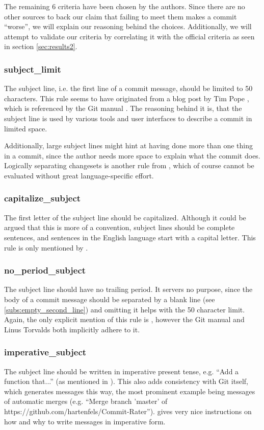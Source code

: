 The remaining 6 criteria have been chosen by the authors. Since there are no other sources to back our claim that failing to meet them makes a commit ``worse'', we will explain our reasoning behind the choices. Additionally, we will attempt to validate our criteria by correlating it with the official criteria as seen in section \ref{sec:results2}.

\subsubsection{subject\_limit}
\label{subs:subject_limit}
The subject line, i.e. the first line of a commit message, should be limited to 50 characters. This rule seems to have originated from a blog post by Tim Pope \cite{TP}, which is referenced by the Git manual \cite{OffGuide}. The reasoning behind it is, that the subject line is used by various tools and user interfaces to describe a commit in limited space.

Additionally, large subject lines might hint at having done more than one thing in a commit, since the author needs more space to explain what the commit does. Logically separating changesets is another rule from \cite{OffGuide}, which of course cannot be evaluated without great language-specific effort.

\subsubsection{capitalize\_subject}
\label{subs:capitalize_subject}
The first letter of the subject line should be capitalized. Although it could be argued that this is more of a convention, subject lines should be complete sentences, and sentences in the English language start with a capital letter. This rule is only mentioned by \cite{CB}.

\subsubsection{no\_period\_subject}
\label{subs:no_period_subject}
The subject line should have no trailing period. It servers no purpose, since the body of a commit message should be separated by a blank line (see \ref{subs:empty_second_line}) and omitting it helps with the 50 character limit. Again, the only explicit mention of this rule is \cite{CB}, however the Git manual \cite{OffGuide} and Linus Torvalds \cite{SR} both implicitly adhere to it.

\subsubsection{imperative\_subject}
\label{subs:imperative_subject}
The subject line should be written in imperative present tense, e.g. ``Add a function that...'' (as mentioned in \cite{OffGuide}). This also adds consistency with Git itself, which generates messages this way, the most prominent example being messages of automatic merges (e.g. ``Merge branch 'master' of https://github.com/hartenfels/Commit-Rater''). \cite{CB} gives very nice instructions on how and why to write messages in imperative form.


